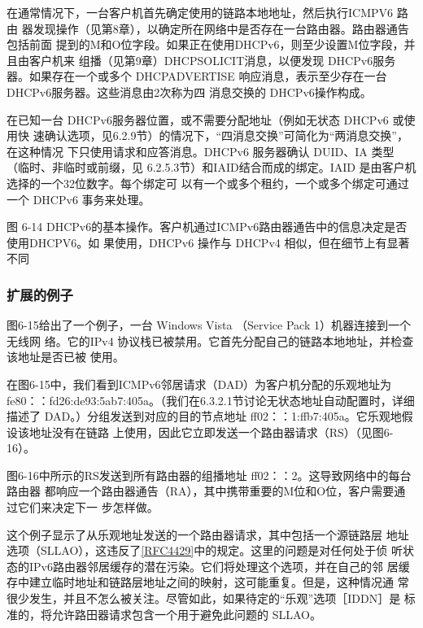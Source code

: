 在通常情况下，一台客户机首先确定使用的链路本地地址，然后执行ICMPV6 路由
器发现操作（见第8章），以确定所在网络中是否存在一台路由器。路由器通告包括前面
提到的M和O位字段。如果正在使用DHCPv6，则至少设置M位字段，并且由客户机来
组播（见第9章）DHCPSOLICIT消息，以便发现 DHCPv6服务器。如果存在一个或多个
DHCPADVERTISE 响应消息，表示至少存在一台 DHCPv6服务器。这些消息由2次称为四
消息交换的 DHCPv6操作构成。

在已知一台 DHCPv6服务器位置，或不需要分配地址（例如无状态 DHCPv6 或使用快
速确认选项，见6.2.9节）的情况下，“四消息交换”可简化为“两消息交换”，在这种情况
下只使用请求和应答消息。DHCPv6 服务器确认 DUID、IA 类型（临时、非临时或前缀，见
6.2.5.3节）和IAID结合而成的绑定。IAID 是由客户机选择的一个32位数字。每个绑定可
以有一个或多个租约，一个或多个绑定可通过一个 DHCPv6 事务来处理。

图 6-14
DHCPv6的基本操作。客户机通过ICMPv6路由器通告中的信息决定是否使用DHCPV6。如
果使用，DHCPv6 操作与 DHCPv4 相似，但在细节上有显著不同

\subsubsection{扩展的例子}

图6-15给出了一个例子，一台 Windows Vista （Service Pack 1）机器连接到一个无线网
络。它的IPv4 协议栈已被禁用。它首先分配自己的链路本地地址，并检查该地址是否已被
使用。

在图6-15中，我们看到ICMPv6邻居请求（DAD）为客户机分配的乐观地址为
fe80：：fd26:de93:5ab7:405a。（我们在6.3.2.1节讨论无状态地址自动配置时，详细描述了
DAD。）分组发送到对应的目的节点地址 ff02：：1:ffb7:405a。它乐观地假设该地址没有在链路
上使用，因此它立即发送一个路由器请求（RS）（见图6-16）。

图6-16中所示的RS发送到所有路由器的组播地址 ff02：：2。这导致网络中的每台路由器
都响应一个路由器通告（RA），其中携带重要的M位和O位，客户需要通过它们来决定下一
步怎样做。

\begin{tcolorbox}
    这个例子显示了从乐观地址发送的一个路由器请求，其中包括一个源链路层
    地址选项（SLLAO），这违反了\href{https://www.rfc-editor.org/rfc/rfc4429}{\href{https://www.rfc-editor.org/rfc/rfc4429}{[RFC4429]}}中的规定。这里的问题是对任何处于侦
    听状态的IPv6路由器邻居缓存的潜在污染。它们将处理这个选项，并在自己的邻
    居缓存中建立临时地址和链路层地址之间的映射，这可能重复。但是，这种情况通
    常很少发生，并且不怎么被关注。尽管如此，如果待定的“乐观”选项［IDDN］是
    标准的，将允许路田器请求包含一个用于避免此问题的 SLLAO。
\end{tcolorbox}


